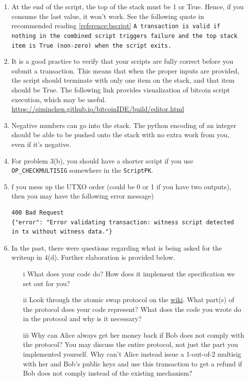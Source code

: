 \documentclass[11pt]{article}
\begin{document}
\begin{enumerate}
\item At the end of the script, the top of the stack must be 1 or True. Hence,  if you consume the last value, it won't work. See the following quote in recommended reading \ref{reference:bscript}  \texttt{A transaction is valid if nothing in the combined script triggers failure and the top stack item is True (non-zero) when the script exits.}

\item It is a good practice to verify that your scripts are fully correct before you submit a transaction. This means that when the proper inputs are provided, the script should terminate with only one item on the stack, and that item should be True. The following link provides visualization of bitcoin script execution, which may be useful. 
\href{https://siminchen.github.io/bitcoinIDE/build/editor.html}{https://siminchen.github.io/bitcoinIDE/build/editor.html}

\item Negative numbers can go into the stack. The python encoding of an integer should be able to be pushed onto the stack with no extra work from you, even if it's negative.

\item For problem 3(b), you should have a shorter script if you use  \texttt{OP\_CHECKMULTISIG} somewhere in the  \texttt{ScriptPK}.

\item f you mess up the UTXO order (could be 0 or 1 if you have two outputs), then you may have the following error message)
\begin{verbatim}
400 Bad Request
{"error": "Error validating transaction: witness script detected 
in tx without witness data."}
\end{verbatim}

\item
In the past, there were questions regarding what is being asked for the writeup in 4(d). Further elaboration is provided below. 
\begin{enumerate}
\item[i] What does your code do? How does it implement the specification we set out for you? 
\item[ii] Look through the atomic swap protocol on the \href{https://en.bitcoin.it/wiki/Atomic_swap}{wiki}. What part(s) of the protocol does your code represent? What does the code you wrote do in the protocol and why is it necessary?
\item[iii] Why can Alice always get her money back if Bob does not comply with the protocol? You may discuss the entire protocol, not just the part you implemented yourself. Why can't Alice instead issue a 1-out-of-2 multisig with her and Bob's public keys and use this transaction to get a refund if Bob does not comply instead of the existing mechanism? 
\end{enumerate}
\end{enumerate}
\end{document}

